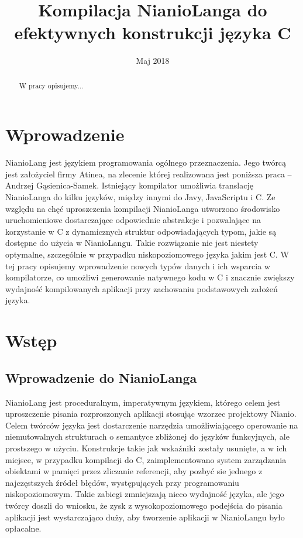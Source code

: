 \documentclass[licencjacka]{pracamgr}
\title{Kompilacja NianioLanga do efektywnych konstrukcji języka C}
\date{Maj 2018}
\begin{document}
\maketitle

\begin{abstract}
W pracy opisujemy...
\end{abstract}

\tableofcontents

\chapter*{Wprowadzenie}
  NianioLang jest językiem programowania ogólnego przeznaczenia. Jego twórcą jest
  założyciel firmy Atinea, na zlecenie której realizowana jest poniższa
  praca -- Andrzej Gąsienica-Samek.
  Istniejący kompilator umożliwia translację NianioLanga do kilku języków,
  między innymi do Javy, JavaScriptu i C.
  Ze względu na chęć uproszczenia kompilacji NianioLanga
  utworzono środowisko uruchomieniowe dostarczające odpowiednie abstrakcje
  i pozwalające na korzystanie w C z dynamicznych struktur odpowiadających typom,
  jakie są dostępne do użycia w NianioLangu. Takie rozwiązanie nie jest
  niestety optymalne, szczególnie w przypadku niskopoziomowego języka jakim
  jest C. W tej pracy opisujemy wprowadzenie nowych typów danych i ich wsparcia
  w kompilatorze, co umożliwi generowanie natywnego kodu w C i znacznie
  zwiększy wydajność kompilowanych aplikacji przy zachowaniu podstawowych założeń języka.
\chapter{Wstęp}
\section{Wprowadzenie do NianioLanga}
NianioLang jest proceduralnym, imperatywnym językiem, którego celem jest
uproszczenie pisania rozproszonych aplikacji stosując wzorzec projektowy
Nianio\cite{wzorzec_nianio}.
Celem twórców języka jest dostarczenie narzędzia umożliwiającego operowanie na niemutowalnych strukturach
o semantyce zbliżonej do języków funkcyjnych, ale prostszego w użyciu.
Konstrukcje takie jak wskaźniki zostały usunięte, a w ich miejsce, w przypadku kompilacji do C,
zaimplementowano system zarządzania obiektami
w pamięci przez zliczanie referencji, aby pozbyć sie jednego z najczęstszych źródeł błędów, występujących przy programowaniu niskopoziomowym.
Takie zabiegi zmniejszają nieco wydajność języka, ale jego twórcy doszli do wniosku, że zysk z wysokopoziomowego podejścia
do pisania aplikacji jest wystarczająco duży, aby tworzenie aplikacji w NianioLangu było opłacalne.
\end{document}
